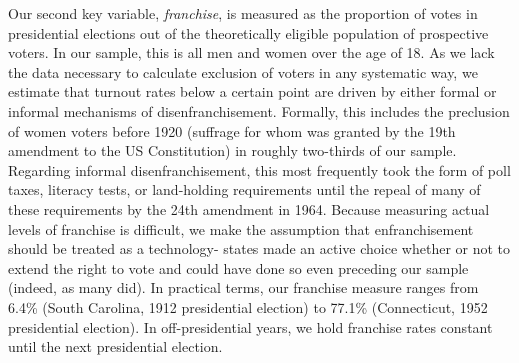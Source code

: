 \documentclass[letter, 12pt]{article}
\begin{document}
Our second key variable, \emph{franchise}, is measured as the proportion of votes in presidential elections out of the theoretically eligible population of prospective voters. In our sample, this is all men and women over the age of 18. As we lack the data necessary to calculate exclusion of voters in any systematic way, we estimate that turnout rates below a certain point are driven by either formal or informal mechanisms of disenfranchisement. Formally, this includes the preclusion of women voters before 1920 (suffrage for whom was granted by the 19th amendment to the US Constitution) in roughly two-thirds of our sample. Regarding informal disenfranchisement, this most frequently took the form of poll taxes, literacy tests, or land-holding requirements until the repeal of many of these requirements by the 24th amendment in 1964. Because measuring actual levels of franchise is difficult, we make the assumption that enfranchisement should be treated as a technology- states made an active choice whether or not to extend the right to vote and could have done so even preceding our sample (indeed, as many did). In practical terms, our franchise measure ranges from 6.4\% (South Carolina, 1912 presidential election) to 77.1\% (Connecticut, 1952 presidential election). In off-presidential years, we hold franchise rates constant until the next presidential election.
\end{document}
